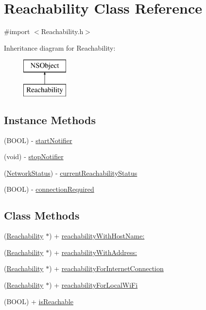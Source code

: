 \hypertarget{interface_reachability}{\section{Reachability Class Reference}
\label{interface_reachability}
}


{\ttfamily \#import $<$Reachability.\-h$>$}

Inheritance diagram for Reachability\-:\begin{figure}[H]
\begin{center}
\leavevmode
\includegraphics[height=2.000000cm]{interface_reachability}
\end{center}
\end{figure}
\subsection*{Instance Methods}
\begin{DoxyCompactItemize}
\item 
(B\-O\-O\-L) -\/ \hyperlink{interface_reachability_ae20732960a222681fcc7caeb191158bc}{start\-Notifier}
\item 
(void) -\/ \hyperlink{interface_reachability_ab7907e9c8de0e4e15774e82c089e0b39}{stop\-Notifier}
\item 
(\hyperlink{_reachability_8h_afbfc456845719ac215946bb2b05eb2df}{Network\-Status}) -\/ \hyperlink{interface_reachability_a8396438436e7ff3770039fb527cd1d34}{current\-Reachability\-Status}
\item 
(B\-O\-O\-L) -\/ \hyperlink{interface_reachability_a731496d70dd8bfbd1b364df13cac2b4c}{connection\-Required}
\end{DoxyCompactItemize}
\subsection*{Class Methods}
\begin{DoxyCompactItemize}
\item 
(\hyperlink{interface_reachability}{Reachability} $\ast$) + \hyperlink{interface_reachability_a0c293c3ffea29c42e8ccbd5d2b39a769}{reachability\-With\-Host\-Name\-:}
\item 
(\hyperlink{interface_reachability}{Reachability} $\ast$) + \hyperlink{interface_reachability_add9b3533dfed13fc2215cc27bca74ace}{reachability\-With\-Address\-:}
\item 
(\hyperlink{interface_reachability}{Reachability} $\ast$) + \hyperlink{interface_reachability_ad2962f5292dee6a56f43175d344c3da1}{reachability\-For\-Internet\-Connection}
\item 
(\hyperlink{interface_reachability}{Reachability} $\ast$) + \hyperlink{interface_reachability_afef931b75654390d24d9c897835929f5}{reachability\-For\-Local\-Wi\-Fi}
\item 
(B\-O\-O\-L) + \hyperlink{interface_reachability_ae0b18fcacc97f538502cf671aa583dbd}{is\-Reachable}
\end{DoxyCompactItemize}
